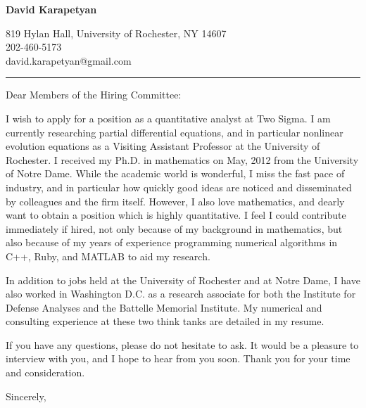 \documentclass[12pt]{letter}
\date{\vspace{0.5cm}\flushleft}
\begin{document}
\begin{letter}{}
\begin{center}
{\bf {\Large David Karapetyan}}
\end{center}

\begin{center}
{819 Hylan Hall, University of Rochester, NY 14607  \\ 
202-460-5173 \\  david.karapetyan@gmail.com
}
\end{center}
\hrule

\opening{Dear Members of the Hiring Committee:\\}
%

%
I wish to apply for a position as a quantitative analyst at Two Sigma. I am
currently researching partial differential equations, and in particular
nonlinear evolution equations as a Visiting Assistant Professor at the
University of Rochester. I received my Ph.D. in mathematics on May, 2012 from
the University of Notre Dame. While the academic world is wonderful, I miss the
fast pace of industry, and in particular how quickly good ideas are noticed and
disseminated by colleagues and the firm itself. However, I also love
mathematics, and dearly want to obtain a position which is highly quantitative.
I feel I could contribute immediately if hired, not only because of my
background in mathematics, but also because of my years of experience
programming numerical algorithms in C++, Ruby, and MATLAB to aid my research.

In addition to jobs held at the University of Rochester and at Notre Dame, I have
also worked in Washington D.C. as a research associate for both the Institute
for Defense Analyses and the Battelle Memorial Institute. My numerical and
consulting experience at these two think tanks are detailed in my resume. 

If you have any questions, please do not hesitate to ask. It would be a
pleasure to interview with you, and I hope to hear from you soon. Thank you for
your time and consideration. 

\closing{Sincerely,}


\end{letter}
\end{document}
